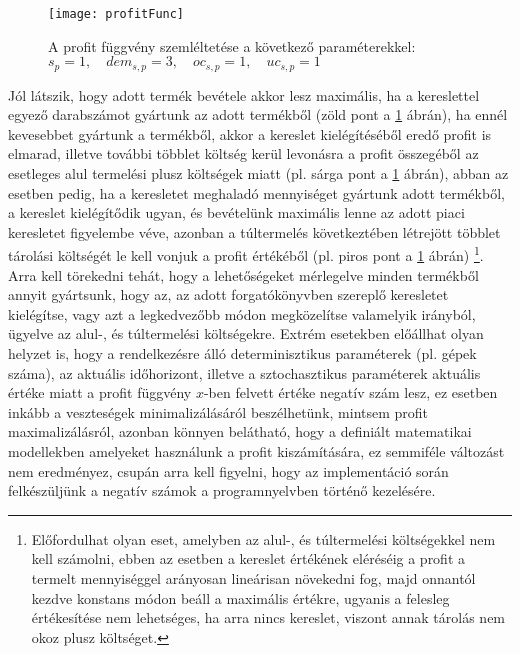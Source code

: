 \begin{figure}
\begin{center}
\texttt{[image: profitFunc]}
\caption[A profit függvény szemléltetése]
    {A profit függvény szemléltetése a következő paraméterekkel: \\ $s_p=1,\quad dem_{s,p}=3, \quad oc_{s,p}=1, \quad  uc_{s,p}=1$\endtabular}
\label{profit_func}
\end{center}
\end{figure}
Jól látszik, hogy adott termék bevétele akkor lesz maximális, ha a kereslettel egyező darabszámot gyártunk az adott termékből (zöld pont a \ref{profit_func} ábrán), ha ennél kevesebbet gyártunk a termékből, akkor a kereslet kielégítéséből eredő profit is elmarad, illetve további többlet költség kerül levonásra a profit összegéből az esetleges alul termelési plusz költségek miatt (pl. sárga pont a \ref{profit_func} ábrán), abban az esetben pedig, ha a keresletet meghaladó mennyiséget gyártunk adott termékből, a kereslet kielégítődik ugyan, és bevételünk maximális lenne az adott piaci keresletet figyelembe véve, azonban a túltermelés következtében létrejött többlet tárolási költségét le kell vonjuk a profit értékéből (pl. piros pont a \ref{profit_func} ábrán) \footnote{Előfordulhat olyan eset, amelyben az alul-, és túltermelési költségekkel nem kell számolni, ebben az esetben a kereslet értékének eléréséig a profit a termelt mennyiséggel arányosan lineárisan növekedni fog, majd onnantól kezdve konstans módon beáll a maximális értékre, ugyanis a felesleg értékesítése nem lehetséges, ha arra nincs kereslet, viszont annak tárolás nem okoz plusz költséget.}.
Arra kell törekedni tehát, hogy a lehetőségeket mérlegelve minden termékből annyit gyártsunk, hogy az, az adott forgatókönyvben szereplő keresletet kielégítse, vagy azt a legkedvezőbb módon megközelítse valamelyik irányból, ügyelve az alul-, és túltermelési költségekre.
Extrém esetekben előállhat olyan helyzet is, hogy a rendelkezésre álló determinisztikus paraméterek (pl. gépek száma), az aktuális időhorizont, illetve a sztochasztikus paraméterek aktuális értéke miatt a profit függvény $x$-ben felvett értéke negatív szám lesz, ez esetben inkább a veszteségek minimalizálásáról beszélhetünk, mintsem profit maximalizálásról, azonban könnyen belátható, hogy a definiált matematikai modellekben amelyeket használunk a profit kiszámítására, ez semmiféle változást nem eredményez, csupán arra kell figyelni, hogy az implementáció során felkészüljünk a negatív számok a programnyelvben történő kezelésére.